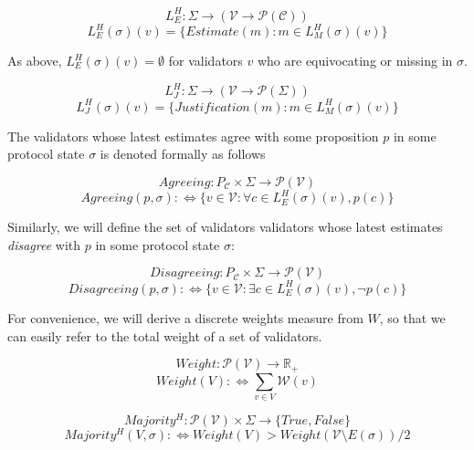 \begin{defn}
$$
L^H_E:\Sigma \to (\mathcal{V} \to \mathcal{P}(\mathcal{C}))
$$
$$
L^H_E(\sigma)(v) = \{Estimate(m) : m \in L^H_M(\sigma)(v)\}
$$
\end{defn}

As above, $L^H_E(\sigma)(v) = \emptyset$ for validators $v$ who are equivocating or missing in $\sigma$.


\begin{defn}
$$
L^H_J:\Sigma \to (\mathcal{V} \to \mathcal{P}(\Sigma))
$$
$$
L^H_J(\sigma)(v) = \{Justification(m) : m \in L^H_M(\sigma)(v)\}
$$
\end{defn}


The validators whose latest estimates agree with some proposition $p$ in some protocol state $\sigma$ is denoted formally as follows
\begin{defn}
$$
Agreeing: P_{\mathcal{C}} \times \Sigma \to \mathcal{P}(\mathcal{V})
$$
$$
Agreeing(p, \sigma) :\Leftrightarrow \{v \in \mathcal{V} : \forall c \in L^H_E(\sigma)(v), p(c)\}
$$
\end{defn}

Similarly, we will define the set of validators validators whose latest estimates \emph{disagree} with $p$ in some protocol state $\sigma$:
\begin{defn}
$$
Disagreeing: P_{\mathcal{C}} \times \Sigma \to \mathcal{P}(\mathcal{V})
$$
$$
Disagreeing(p, \sigma) :\Leftrightarrow \{v \in \mathcal{V} : \exists c \in L^H_E(\sigma)(v), \neg p(c)\}
$$
\end{defn}

For convenience, we will derive a discrete weights measure from $W$, so that we can easily refer to the total weight of a set of validators.

\begin{defn}
$$
Weight: \mathcal{P}(\mathcal{V}) \to \mathbb{R}_+
$$
$$
Weight(V) :\Leftrightarrow \sum_{v \in V} \mathcal{W}(v)
$$
\end{defn}


\begin{defn}
$$
Majority^H: \mathcal{P}(\mathcal{V}) \times \Sigma \to \{True, False\}
$$
$$
Majority^H(V, \sigma) :\Leftrightarrow Weight(V) > Weight(\mathcal{V} \setminus E(\sigma))/2
$$
\end{defn}


